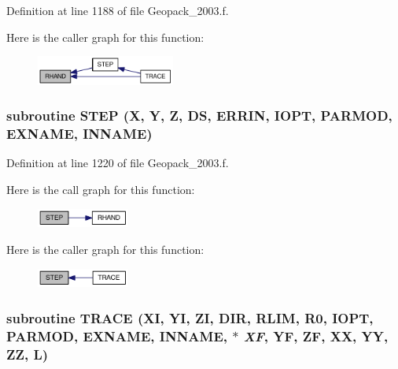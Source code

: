 Definition at line 1188 of file Geopack\_\-2003.f.

Here is the caller graph for this function:\nopagebreak
\begin{figure}[H]
\begin{center}
\leavevmode
\includegraphics[width=129pt]{_geopack__2003_8f_964ce3d6c1eb16a70ec41d33544e4d07_icgraph}
\end{center}
\end{figure}
\hypertarget{_geopack__2003_8f_4b84b9909d3de37b1cbfd0e8ef98d2af}{
\subsubsection[{STEP}]{\setlength{\rightskip}{0pt plus 5cm}subroutine STEP (X, \/  Y, \/  Z, \/  DS, \/  ERRIN, \/  IOPT, \/  PARMOD, \/  EXNAME, \/  INNAME)}}
\label{_geopack__2003_8f_4b84b9909d3de37b1cbfd0e8ef98d2af}




Definition at line 1220 of file Geopack\_\-2003.f.

Here is the call graph for this function:\nopagebreak
\begin{figure}[H]
\begin{center}
\leavevmode
\includegraphics[width=86pt]{_geopack__2003_8f_4b84b9909d3de37b1cbfd0e8ef98d2af_cgraph}
\end{center}
\end{figure}


Here is the caller graph for this function:\nopagebreak
\begin{figure}[H]
\begin{center}
\leavevmode
\includegraphics[width=86pt]{_geopack__2003_8f_4b84b9909d3de37b1cbfd0e8ef98d2af_icgraph}
\end{center}
\end{figure}
\hypertarget{_geopack__2003_8f_e88b362d0d3c99ad9c733e9fc088b731}{
\subsubsection[{TRACE}]{\setlength{\rightskip}{0pt plus 5cm}subroutine TRACE (XI, \/  YI, \/  ZI, \/  DIR, \/  RLIM, \/  R0, \/  IOPT, \/  PARMOD, \/  EXNAME, \/  INNAME, \/  $\ast$ {\em XF}, \/  YF, \/  ZF, \/  XX, \/  YY, \/  ZZ, \/  L)}}
\label{_geopack__2003_8f_e88b362d0d3c99ad9c733e9fc088b731}




